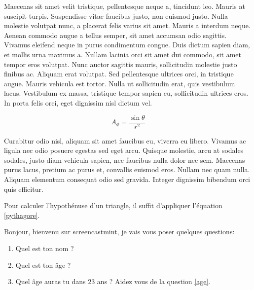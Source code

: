 \documentclass[a4paper]{article}
\begin{document}
Maecenas sit amet velit tristique, pellentesque neque a, tincidunt leo. Mauris at suscipit turpis. Suspendisse vitae faucibus justo, non euismod justo. Nulla molestie volutpat nunc, a placerat felis varius sit amet. Mauris a interdum neque. Aenean commodo augue a tellus semper, sit amet accumsan odio sagittis. Vivamus eleifend neque in purus condimentum congue. Duis dictum sapien diam, et mollis urna maximus a. Nullam lacinia orci sit amet dui commodo, sit amet tempor eros volutpat. Nunc auctor sagittis mauris, sollicitudin molestie justo finibus ac. Aliquam erat volutpat. Sed pellentesque ultrices orci, in tristique augue. Mauris vehicula est tortor. Nulla ut sollicitudin erat, quis vestibulum lacus. Vestibulum ex massa, tristique tempor sapien eu, sollicitudin ultrices eros. In porta felis orci, eget dignissim nisl dictum vel.

\begin{equation}
  \label{eq:101}
  A_\phi=\frac{\sin\theta}{r^2}
\end{equation}

Curabitur odio nisl, aliquam sit amet faucibus eu, viverra eu libero. Vivamus ac ligula nec odio posuere egestas sed eget arcu. Quisque molestie, arcu at sodales sodales, justo diam vehicula sapien, nec faucibus nulla dolor nec sem. Maecenas purus lacus, pretium ac purus et, convallis euismod eros. Nullam nec quam nulla. Aliquam elementum consequat odio sed gravida. Integer dignissim bibendum orci quis efficitur.

Pour calculer l'hypothénuse d'un triangle, il suffit d'appliquer l'équation \ref{pythagore}.

Bonjour, bienvenu sur screencastmint, je vais vous poser quelques questions:

\begin{enumerate}
\item Quel est ton nom ?
\item Quel est ton âge ? \label{age}
\item Quel âge auras tu dans 23 ans ? Aidez vous de la question \ref{age}.
\end{enumerate}
\end{document}
